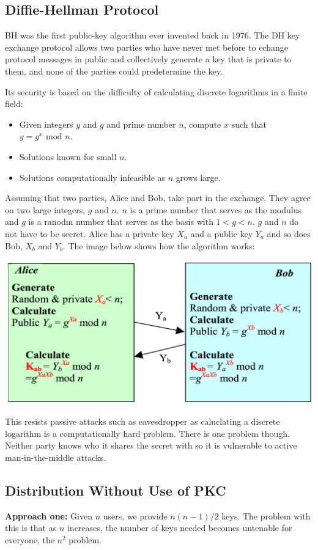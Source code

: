 \documentclass{article}
\newcommand{\Mod}[1]{\text{ mod }#1}
\begin{document}
\subsection{Diffie-Hellman Protocol}
BH was the first public-key algorithm ever invented back in 1976. The DH key exchange protocol allows two parties who have never met before to echange protocol messages in public and collectively generate a key that is private to them, and none of the parties could predetermine the key.

Its security is based on the difficulty of calculating discrete logarithms in a finite field:
\begin{itemize}
  \item Given integers $y$ and $g$ and prime number $n$, compute $x$ such that $y = g^{x} \Mod n$.
  \item Solutions known for small $n$.
  \item Solutions computationally infeasible as $n$ grows large.
\end{itemize}
Assuming that two parties, Alice and Bob, take part in the exchange. They agree on two large integers, $g$ and $n$. $n$ is a prime number that serves as the modulus and $g$ is a ranodm number that serves as the basis with $1 < g < n$. $g$ and $n$ do not have to be secret. Alice has a private key $X_{a}$ and a public key $Y_{a}$ and so does Bob, $X_{b}$ and $Y_{b}$. The image below shows how the algorithm works:
\begin{center}
  \includegraphics[scale=0.3]{dh.png}
\end{center}
This resists passive attacks such as eavesdropper as caluclating a discrete logarithm is a computationally hard problem. There is one problem though. Neither party knows who it shares the secret with so it is vulnerable to active man-in-the-middle attacks.

\subsection{Distribution Without Use of PKC}
\textbf{Approach one:} Given $n$ users, we provide $n(n-1)/2$ keys. The problem with this is that as $n$ increases, the number of keys needed becomes untenable for everyone, the $n^{2}$ problem.
\end{document}
